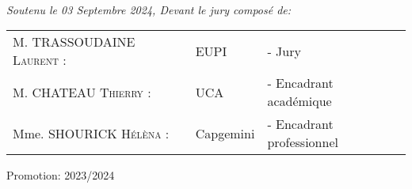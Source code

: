 \documentclass[a4paper,12pt]{report}
\begin{document}
\begin{titlepage}
\begin{minipage}[t]{0.55\textwidth}
\begin{flushright}
    \end{flushright}
  \end{minipage}\\[1cm]
  \vspace{10mm}

  {\large \textit{Soutenu le 03 Septembre 2024, Devant le jury composé de: }}\\[0.5cm]

  \centering
  \begin{tabular}{lll}
    \large M. TRASSOUDAINE \textsc{Laurent} : & \large EUPI & \large - Jury \\[0.1cm]
    \large M. CHATEAU \textsc{Thierry}     :   & \large UCA & \large - Encadrant académique  \\[0.1cm]
    \large Mme. SHOURICK \textsc{Hélèna}     :   & \large Capgemini & \large - Encadrant professionnel \\[0.1cm]

  \end{tabular}

  \vspace{15mm}
  {\large Promotion: 2023/2024}

\end{titlepage}
\end{document}
